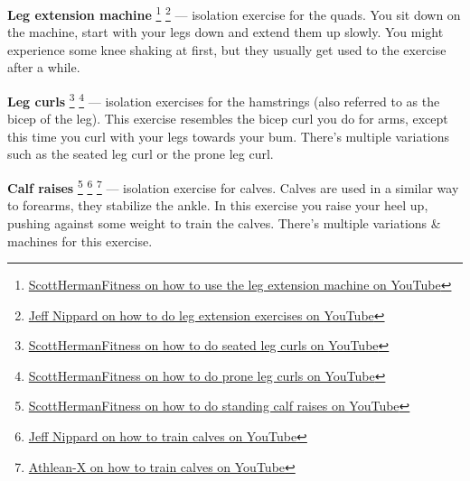 \documentclass[openany, 12pt]{book}
\begin{document}
        \textbf{Leg extension machine}
        \footnote{\href{https://www.youtube.com/watch?v=YyvSfVjQeL0}{ScottHermanFitness on how to use the leg extension machine on YouTube}}
        \footnote{\href{https://www.youtube.com/watch?v=YyvSfVjQeL0}{Jeff Nippard on how to do leg extension exercises on YouTube}}
        ---
        isolation exercise for the quads. You sit down on the machine, start with your legs down and extend them up slowly. You might experience some knee shaking at first, but they usually get used
        to the exercise after a while.
        
        \textbf{Leg curls}
        \footnote{\href{https://www.youtube.com/watch?v=ELOCsoDSmrg}{ScottHermanFitness on how to do seated leg curls on YouTube}}
        \footnote{\href{https://www.youtube.com/watch?v=1Tq3QdYUuHs}{ScottHermanFitness on how to do prone leg curls on YouTube}}
        ---
        isolation exercises for the hamstrings (also referred to as the bicep of the leg). This exercise resembles the bicep curl you do for arms, except this time you curl with your legs
        towards your bum.
        There's multiple variations such as the seated leg curl or the prone leg curl.

        \textbf{Calf raises}
        \footnote{\href{https://www.youtube.com/watch?v=YMmgqO8Jo-k}{ScottHermanFitness on how to do standing calf raises on YouTube}}
        \footnote{\href{https://www.youtube.com/watch?v=YMmgqO8Jo-k}{Jeff Nippard on how to train calves on YouTube}}
        \footnote{\href{https://www.youtube.com/watch?v=esdQSIxteQg}{Athlean-X on how to train calves on YouTube}}
        ---
        isolation exercise for calves. Calves are used in a similar way to forearms, they stabilize the ankle. In this exercise you raise your heel up, pushing against some weight to train the calves.
        There's multiple variations \& machines for this exercise.
\end{document}
